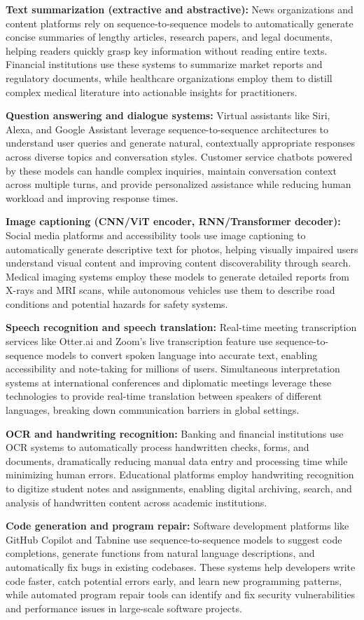 \textbf{Text summarization (extractive and abstractive):} News organizations and content platforms rely on sequence-to-sequence models to automatically generate concise summaries of lengthy articles, research papers, and legal documents, helping readers quickly grasp key information without reading entire texts. Financial institutions use these systems to summarize market reports and regulatory documents, while healthcare organizations employ them to distill complex medical literature into actionable insights for practitioners.

\textbf{Question answering and dialogue systems:} Virtual assistants like Siri, Alexa, and Google Assistant leverage sequence-to-sequence architectures to understand user queries and generate natural, contextually appropriate responses across diverse topics and conversation styles. Customer service chatbots powered by these models can handle complex inquiries, maintain conversation context across multiple turns, and provide personalized assistance while reducing human workload and improving response times.

\textbf{Image captioning (CNN/ViT encoder, RNN/Transformer decoder):} Social media platforms and accessibility tools use image captioning to automatically generate descriptive text for photos, helping visually impaired users understand visual content and improving content discoverability through search. Medical imaging systems employ these models to generate detailed reports from X-rays and MRI scans, while autonomous vehicles use them to describe road conditions and potential hazards for safety systems.

\textbf{Speech recognition and speech translation:} Real-time meeting transcription services like Otter.ai and Zoom's live transcription feature use sequence-to-sequence models to convert spoken language into accurate text, enabling accessibility and note-taking for millions of users. Simultaneous interpretation systems at international conferences and diplomatic meetings leverage these technologies to provide real-time translation between speakers of different languages, breaking down communication barriers in global settings.

\textbf{OCR and handwriting recognition:} Banking and financial institutions use OCR systems to automatically process handwritten checks, forms, and documents, dramatically reducing manual data entry and processing time while minimizing human errors. Educational platforms employ handwriting recognition to digitize student notes and assignments, enabling digital archiving, search, and analysis of handwritten content across academic institutions.

\textbf{Code generation and program repair:} Software development platforms like GitHub Copilot and Tabnine use sequence-to-sequence models to suggest code completions, generate functions from natural language descriptions, and automatically fix bugs in existing codebases. These systems help developers write code faster, catch potential errors early, and learn new programming patterns, while automated program repair tools can identify and fix security vulnerabilities and performance issues in large-scale software projects.

